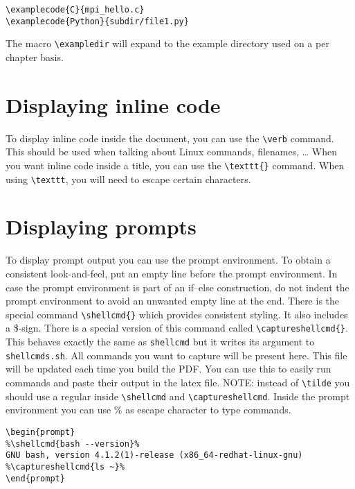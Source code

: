 \documentclass[11pt,a4paper]{article}
\begin{document}
\begin{verbatim}
\examplecode{C}{mpi_hello.c}
\examplecode{Python}{subdir/file1.py}
\end{verbatim}


The macro \verb|\exampledir| will expand to the example directory used on a per
chapter basis.

\section{Displaying inline code}
\label{sec:displaying-inline-code}

To display inline code inside the document, you can use the \verb|\verb| command.
This should be used when talking about Linux commands, filenames, \ldots
When you want inline code inside a title, you can use the \verb|\texttt{}| command.
When using \verb|\texttt|, you will need to escape certain characters.

\section{Displaying prompts}
\label{sec:displaying-prompts}

To display prompt output you can use the prompt environment. To obtain a
consistent look-and-feel, put an empty line before the prompt environment.  In
case the prompt environment is part of an if--else construction, do not indent
the prompt environment to avoid an unwanted empty line at the end.  There
is the special command \verb|\shellcmd{}| which provides consistent styling. It
also includes a \$-sign. There is a special version of this command called
\verb|\captureshellcmd{}|. This behaves exactly the same as \lstinline|shellcmd| but
it writes its argument to \lstinline|shellcmds.sh|. All commands you want to capture
will be present here. This file will be updated each time you build the PDF.
You can use this to easily run commands and paste their output in the latex
file. NOTE: instead of \verb|\tilde| you should use a regular \tilde{} inside
\verb|\shellcmd| and \verb|\captureshellcmd|. Inside the prompt environment you
can use \% as escape character to type commands.

\begin{verbatim}
\begin{prompt}
%\shellcmd{bash --version}%
GNU bash, version 4.1.2(1)-release (x86_64-redhat-linux-gnu)
%\captureshellcmd{ls ~}%
\end{prompt}
\end{verbatim}
\end{document}
